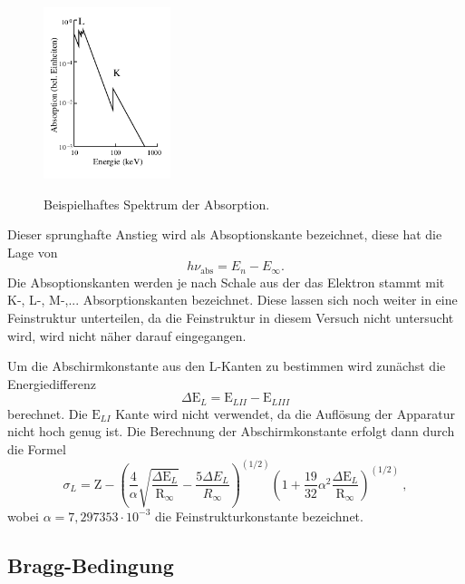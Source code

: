 \begin{figure}
  \centering
  \includegraphics[height=5cm]{kont2.png}
  \caption{Beispielhaftes Spektrum der Absorption.}
  \label{fig:kont2}
  \cite{skript}
\end{figure}
Dieser sprunghafte Anstieg wird als Absoptionskante bezeichnet, diese hat die Lage von
\begin{equation}
  h\nu_{\text{abs}}=E_n - E_{\infty}.
\end{equation}
Die Absoptionskanten werden je nach Schale aus der das Elektron stammt mit
K-, L-, M-,... Absorptionskanten bezeichnet. Diese lassen sich noch weiter in
eine Feinstruktur unterteilen, da die Feinstruktur in diesem Versuch nicht untersucht wird,
wird nicht näher darauf eingegangen.

Um die Abschirmkonstante aus den L-Kanten zu bestimmen wird zunächst die Energiedifferenz
\begin{equation}
  \Delta \text{E}_L = \text{E}_{LII} - \text{E}_{LIII}
\end{equation}
berechnet. Die $\text{E}_{LI}$ Kante wird nicht verwendet, da die Auflösung der
Apparatur nicht hoch genug ist.
Die Berechnung der Abschirmkonstante erfolgt dann durch die Formel
\begin{equation}
  \sigma_L = \text{Z} - \left(\frac{4}{\alpha}\sqrt{\frac{\Delta\text{E}_L}{\text{R}_{\infty}}}-
  \frac{5 \Delta E_L}{R_{\infty}} \right)^{(1/2)}
  \left(1+\frac{19}{32}\alpha^2\frac{\Delta\text{E}_L}{\text{R}_\infty}\right)^{(1/2)} \: ,
  \label{eqn:L}
\end{equation}
wobei $\alpha=7,297353 \cdot 10^{-3}$ die Feinstrukturkonstante bezeichnet.

\subsection{Bragg-Bedingung}

